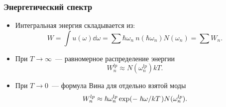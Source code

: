 \documentclass[compress]{beamer}
\begin{document}
    \begin{frame}\frametitle{Энергетический спектр}

        \begin{itemize}\justifying
            \item Интегральная энергия складывается из:
            \begin{equation*}
                W = \int u(\omega) \dd{\omega} = \sum \hbar\omega_n\ n(\hbar\omega_n) N(\omega_n) = \sum W_n .
            \end{equation*}

            \item При $T \to \infty$~--- равномерное распределение энергии
            \begin{equation*}
                W^{lp}_n \approx N(\omega^{lp}_n) kT .
            \end{equation*}

            \item При $T \to 0$~--- формула Вина для отдельно взятой моды
            \begin{equation*}
                W^{lp}_n \approx \hbar\omega^{lp}_n \exp(-\flatfrac{\hbar\omega}{kT}) N(\omega^{lp}_n) .
            \end{equation*}

        \end{itemize}

    \end{frame}

\end{document}
